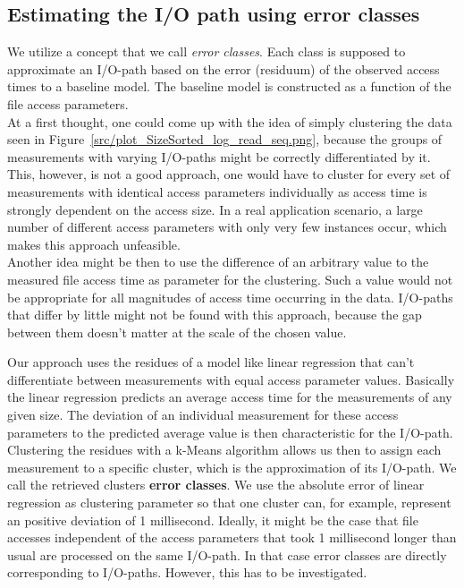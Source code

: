 \documentclass{superfri}
\begin{document}
\subsection{Estimating the I/O path using error classes}
\label{sec:error_classes}
We utilize a concept that we call \textit{error classes}.
Each class is supposed to approximate an I/O-path based on the error (residuum) of the observed access times to a baseline model.
The baseline model is constructed as a function of the file access parameters.\\

At a first thought, one could come up with the idea of simply clustering the data seen in Figure~\ref{src/plot_SizeSorted_log_read_seq.png}, because the groups of measurements with varying I/O-paths might be correctly differentiated by it. 
This, however, is not a good approach, one would have to cluster for every set of measurements with identical access parameters individually as access time is strongly dependent on the access size. 
In a real application scenario, a large number of different access parameters with only very few instances occur, which makes this approach unfeasible.\\
Another idea might be then to use the difference of an arbitrary value to the measured file access time as parameter for the clustering. 
Such a value would not be appropriate for all magnitudes of access time occurring in the data.
I/O-paths that differ by little might not be found with this approach, because the gap between them doesn't matter at the scale of the chosen value.

Our approach uses the residues of a model like linear regression that can't differentiate between measurements with equal access parameter values.
Basically the linear regression predicts an average access time for the measurements of any given size.
The deviation of an individual measurement for these access parameters to the predicted average value is then characteristic for the I/O-path.
Clustering the residues with a k-Means algorithm allows us then to assign each measurement to a specific cluster, which is the approximation of its I/O-path.
We call the retrieved clusters \textbf{error classes}.
We use the absolute error of linear regression as clustering parameter so that one cluster can, for example, represent an positive deviation of 1 millisecond.
Ideally, it might be the case that file accesses independent of the access parameters that took 1 millisecond longer than usual are processed on the same I/O-path.
In that case error classes are directly corresponding to I/O-paths. 
However, this has to be investigated.
\end{document}
